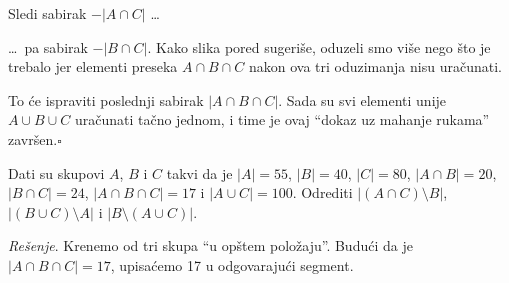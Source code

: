 \noindent
\begin{minipage}{3in}
  Sledi sabirak $-|A \cap C|$ \ldots
\end{minipage}
\hfill
\begin{minipage}{2.5in}
  \begin{center}
    
  \end{center}
\end{minipage}

\medskip

\noindent
\begin{minipage}{3in}
  \ldots\ pa sabirak $-|B \cap C|$. Kako slika pored sugeri\v se, oduzeli smo vi\v se nego \v sto je
  trebalo jer elementi preseka $A \cap B \cap C$ nakon ova tri oduzimanja nisu ura\v cunati.
\end{minipage}
\hfill
\begin{minipage}{2.5in}
  \begin{center}
    
  \end{center}
\end{minipage}

\medskip

\noindent
\begin{minipage}{3in}
  To \'ce ispraviti poslednji sabirak $|A \cap B \cap C|$. Sada su svi elementi unije
  $A \cup B \cup C$ ura\v cunati ta\v cno jednom, i time je ovaj \enquote{dokaz uz mahanje rukama} zavr\v sen.\hfill$\square$
\end{minipage}
\hfill
\begin{minipage}{2.5in}
  \begin{center}
    
  \end{center}
\end{minipage}

\begin{EX}
  Dati su skupovi $A$, $B$ i $C$ takvi da je $|A| = 55$, $|B| = 40$, $|C| = 80$, $|A \cap B| = 20$,
  $|B \cap C| = 24$, $|A \cap B \cap C| = 17$ i $|A \cup C| = 100$. Odrediti $|(A \cap C) \setminus B|$, $|(B \cup C) \setminus A|$ i
  $|B \setminus (A \cup C)|$.
\end{EX}
\noindent
\begin{minipage}{3in}
  \noindent\textit{Re\v senje}. Krenemo od tri skupa \enquote{u op\v stem polo\v zaju}.
  Budu\'ci da je $|A \cap B \cap C| = 17$, upisa\'cemo 17 u odgovaraju\'ci segment.
\end{minipage}
\hfill
\begin{minipage}{2.5in}
  \begin{center}
    
  \end{center}
\end{minipage}

